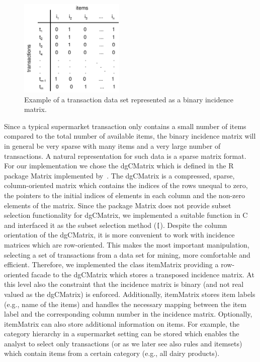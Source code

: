 \documentclass[10pt,a4paper]{article}
\newcommand{\strong}[1]{{\normalfont\fontseries{b}\selectfont #1}}
\newcommand{\class}[1]{\textsf{#1}}
\newcommand{\code}[1]{\texttt{#1}}
\newcommand{\pkg}[1]{\strong{#1}}
\newcommand{\proglang}[1]{\textsf{#1}}
\begin{document}
\begin{figure}[tp]
\centering
\includegraphics[width=5cm]{incidenceMatrix}
\caption{Example of a transaction data set represented as a binary incidence matrix.\label{fig:incidenceMatrix}}
\end{figure}


Since a typical supermarket transaction only contains a small number of
items compared to the total number of available items, the
binary incidence matrix will
in general be very sparse with many items and a very large number of
transactions.  A natural representation for such data is a sparse matrix
format.  For our implementation we chose the \class{dgCMatrix} which is
defined in the \proglang{R} package \pkg{Matrix} 
implemented by~\cite{arules:Bates+Maechler:2005}. The \class{dgCMatrix}
is a compressed, sparse, column-oriented matrix which contains the
indices of the rows unequal to zero, the pointers to the initial indices
of elements in each column and the non-zero elements of the matrix.
Since the package \pkg{Matrix} does not provide subset selection
functionality for \class{dgCMatrix}, we implemented a suitable function
in \proglang{C} and interfaced it as the subset selection method (\code{[}).
Despite the column orientation of the \class{dgCMatrix}, it is more
convenient to work with incidence matrices which are row-oriented.  This
makes the most important manipulation, selecting a set of transactions
from a data set for mining, more comfortable and efficient.  Therefore,
we implemented the class \class{itemMatrix} providing a row-oriented
facade to the \class{dgCMatrix} which stores a transposed incidence
matrix.  At this level also the constraint that the incidence matrix is
binary (and not real valued as the \class{dgCMatrix}) is enforced.
Additionally, \class{itemMatrix} stores item labels (e.g., name
of the items) and handles the necessary mapping between the item label and the
corresponding column number in the incidence matrix.  Optionally,
\class{itemMatrix} can also store additional information on items. For
example, the category hierarchy in a supermarket setting can be stored which
enables the analyst to select only transactions (or as we later see also rules
and itemsets) which contain items from a certain category (e.g., all dairy
products). 
\end{document}
